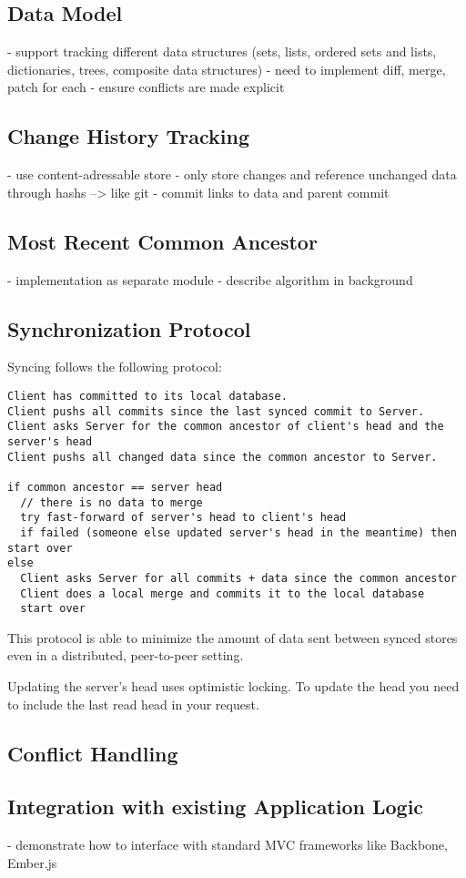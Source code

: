 \subsection{Data Model}
- support tracking different data structures (sets, lists, ordered sets and lists, dictionaries, trees, composite data structures)
- need to implement diff, merge, patch for each
- ensure conflicts are made explicit

\subsection{Change History Tracking}
- use content-adressable store
- only store changes and reference unchanged data through hashs --> like git
- commit links to data and parent commit

\subsection{Most Recent Common Ancestor}
- implementation as separate module
- describe algorithm in background

\subsection{Synchronization Protocol}
Syncing follows the following protocol:

\begin{verbatim}
Client has committed to its local database.
Client pushs all commits since the last synced commit to Server.
Client asks Server for the common ancestor of client's head and the server's head
Client pushs all changed data since the common ancestor to Server.

if common ancestor == server head
  // there is no data to merge
  try fast-forward of server's head to client's head
  if failed (someone else updated server's head in the meantime) then start over
else
  Client asks Server for all commits + data since the common ancestor
  Client does a local merge and commits it to the local database
  start over
\end{verbatim}

This protocol is able to minimize the amount of data sent between synced
stores even in a distributed, peer-to-peer setting.

Updating the server's head uses optimistic locking. To update the head
you need to include the last read head in your request.

\subsection{Conflict Handling}

\subsection{Integration with existing Application Logic}
- demonstrate how to interface with standard MVC frameworks like Backbone, Ember.js
